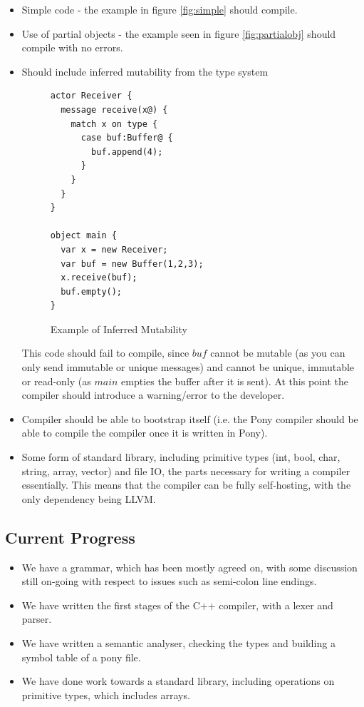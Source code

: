 \documentclass[pdftex,12pt,a4paper]{article}
\begin{document}
\begin{itemize}

\item Simple code - the example in figure \ref{fig:simple} should compile.
\item Use of partial objects - the example seen in figure \ref{fig:partialobj} should compile with no errors.

\item Should include inferred mutability from the type system

\begin{figure}[H]
\begin{verbatim}
actor Receiver {
  message receive(x@) {
    match x on type {
      case buf:Buffer@ {
        buf.append(4);
      }
    }
  }
}

object main {
  var x = new Receiver;
  var buf = new Buffer(1,2,3);
  x.receive(buf);
  buf.empty();
}
\end{verbatim}
\caption{Example of Inferred Mutability}
\end{figure}

This code should fail to compile, since $buf$ cannot be mutable (as you can only send immutable or unique messages) and cannot be unique, immutable or read-only (as $main$ empties the buffer after it is sent).
At this point the compiler should introduce a warning/error to the developer.

\item Compiler should be able to bootstrap itself (i.e. the Pony compiler should be able to compile the compiler once it is written in Pony).

\item Some form of standard library, including primitive types (int, bool, char, string, array, vector) and file IO, the parts necessary for writing a compiler essentially.
	This means that the compiler can be fully self-hosting, with the only dependency being LLVM.
\end{itemize}

\subsection{Current Progress}

\begin{itemize}
\item We have a grammar, which has been mostly agreed on, with some discussion still on-going with respect to issues such as semi-colon line endings.
\item We have written the first stages of the C++ compiler, with a lexer and parser.
\item We have written a semantic analyser, checking the types and building a symbol table of a pony file.
\item We have done work towards a standard library, including operations on primitive types, which includes arrays.
\end{itemize}



\end{document}
